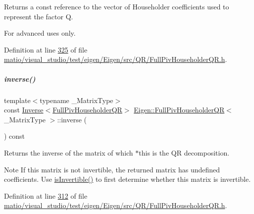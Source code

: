 \begin{DoxyReturn}{Returns}
a const reference to the vector of Householder coefficients used to represent the factor {\ttfamily Q}.
\end{DoxyReturn}
For advanced uses only. 

Definition at line \hyperlink{matio_2visual__studio_2test_2eigen_2_eigen_2src_2_q_r_2_full_piv_householder_q_r_8h_source_l00325}{325} of file \hyperlink{matio_2visual__studio_2test_2eigen_2_eigen_2src_2_q_r_2_full_piv_householder_q_r_8h_source}{matio/visual\+\_\+studio/test/eigen/\+Eigen/src/\+Q\+R/\+Full\+Piv\+Householder\+Q\+R.\+h}.

\mbox{\label{group___q_r___module_a352ce66397af06da214ddde343cec6f5}} 
\subparagraph{\texorpdfstring{inverse()}{inverse()}\hspace{0.1cm}{\footnotesize\ttfamily [1/2]}}
{\footnotesize\ttfamily template$<$typename \+\_\+\+Matrix\+Type$>$ \\
const \hyperlink{class_eigen_1_1_inverse}{Inverse}$<$\hyperlink{group___q_r___module_class_eigen_1_1_full_piv_householder_q_r}{Full\+Piv\+Householder\+QR}$>$ \hyperlink{group___q_r___module_class_eigen_1_1_full_piv_householder_q_r}{Eigen\+::\+Full\+Piv\+Householder\+QR}$<$ \+\_\+\+Matrix\+Type $>$\+::inverse (\begin{DoxyParamCaption}{ }\end{DoxyParamCaption}) const\hspace{0.3cm}{\ttfamily [inline]}}

\begin{DoxyReturn}{Returns}
the inverse of the matrix of which $\ast$this is the QR decomposition.
\end{DoxyReturn}
\begin{DoxyNote}{Note}
If this matrix is not invertible, the returned matrix has undefined coefficients. Use \hyperlink{group___q_r___module_aeb1d779ec22ec68a5a28d4235db02ec1}{is\+Invertible()} to first determine whether this matrix is invertible. 
\end{DoxyNote}


Definition at line \hyperlink{matio_2visual__studio_2test_2eigen_2_eigen_2src_2_q_r_2_full_piv_householder_q_r_8h_source_l00312}{312} of file \hyperlink{matio_2visual__studio_2test_2eigen_2_eigen_2src_2_q_r_2_full_piv_householder_q_r_8h_source}{matio/visual\+\_\+studio/test/eigen/\+Eigen/src/\+Q\+R/\+Full\+Piv\+Householder\+Q\+R.\+h}.

